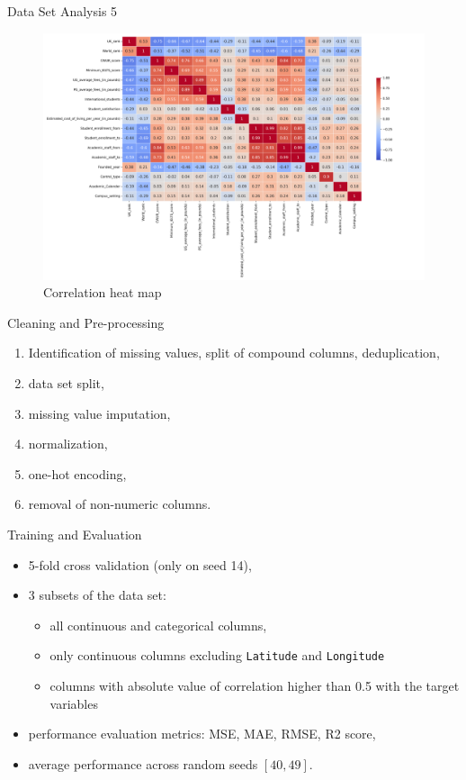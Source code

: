 \documentclass{beamer} %
\begin{document}
\begin{frame}{Data Set Analysis 5}
  \vspace{-1.25cm}
  \begin{figure}
    \centering
    \includegraphics[width=0.92 \textwidth]{figs/correlation_heatmap.png}
    \caption{Correlation heat map}
    \label{fig:corr_heatmap}
\end{figure}
\end{frame}

\begin{frame}{Cleaning and Pre-processing}
  \vspace{-1cm}
  \begin{enumerate}
      \item Identification of missing values, split of compound columns, deduplication,
      \item data set split,
      \item missing value imputation,
      \item normalization,
      \item one-hot encoding,
      \item removal of non-numeric columns.
  \end{enumerate}
\end{frame}

\begin{frame}{Training and Evaluation}
  \vspace{-1cm}
  \begin{itemize}
      \item 5-fold cross validation (only on seed 14),
      \item 3 subsets of the data set:
        \begin{itemize}
            \item all continuous and categorical columns,
            \item only continuous columns excluding \texttt{Latitude} and \texttt{Longitude}
            \item columns with absolute value of correlation higher than 0.5 with the target variables
        \end{itemize}
      \item performance evaluation metrics: MSE, MAE, RMSE, R2 score,
      \item average performance across random seeds $[40, 49]$.
  \end{itemize}
\end{frame}
\end{document}
